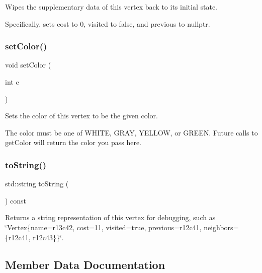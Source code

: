 Wipes the supplementary data of this vertex back to its initial state. 

Specifically, sets cost to 0, visited to false, and previous to nullptr. \mbox{\label{classVertexGen_a5551ca73ea9118c8dc6dbfd26e72e3d6}} 
\subsubsection{\texorpdfstring{set\+Color()}{setColor()}}
{\footnotesize\ttfamily void set\+Color (\begin{DoxyParamCaption}\item[{int}]{c }\end{DoxyParamCaption})}



Sets the color of this vertex to be the given color. 

The color must be one of W\+H\+I\+TE, G\+R\+AY, Y\+E\+L\+L\+OW, or G\+R\+E\+EN. Future calls to get\+Color will return the color you pass here. \mbox{\label{classVertexGen_a1fe5121d6528fdea3f243321b3fa3a49}} 
\subsubsection{\texorpdfstring{to\+String()}{toString()}}
{\footnotesize\ttfamily std\+::string to\+String (\begin{DoxyParamCaption}{ }\end{DoxyParamCaption}) const}



Returns a string representation of this vertex for debugging, such as \char`\"{}\+Vertex\{name=r13c42, cost=11, visited=true, previous=r12c41, neighbors=\{r12c41, r12c43\}\}\char`\"{}. 



\subsection{Member Data Documentation}
\mbox{\label{classVertexGen_aa0cee1fcace4fca3db468e83aa4672fe}} 
